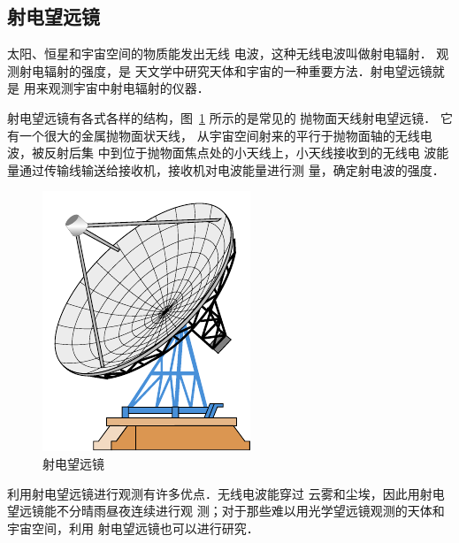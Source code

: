 \subsection*{射电望远镜}
太阳、恒星和宇宙空间的物质能发出无线
电波，这种无线电波叫做射电辐射．
观测射电辐射的强度，是
天文学中研究天体和宇宙的一种重要方法．射电望远镜就是
用来观测宇宙中射电辐射的仪器．


射电望远镜有各式各样的结构，图~\ref{fig_C_5-57} 所示的是常见的
抛物面天线射电望远镜．
它有一个很大的金属抛物面状天线，
从宇宙空间射来的平行于抛物面轴的无线电波，被反射后集
中到位于抛物面焦点处的小天线上，小天线接收到的无线电
波能量通过传输线输送给接收机，接收机对电波能量进行测
量，确定射电波的强度．
\begin{figure}[htbp]
	\centering
	\includegraphics{fig/C/5-57.pdf}
	\caption{射电望远镜}\label{fig_C_5-57}
\end{figure}



利用射电望远镜进行观测有许多优点．无线电波能穿过
云雾和尘埃，因此用射电望远镜能不分晴雨昼夜连续进行观
测；对于那些难以用光学望远镜观测的天体和宇宙空间，利用
射电望远镜也可以进行研究．

